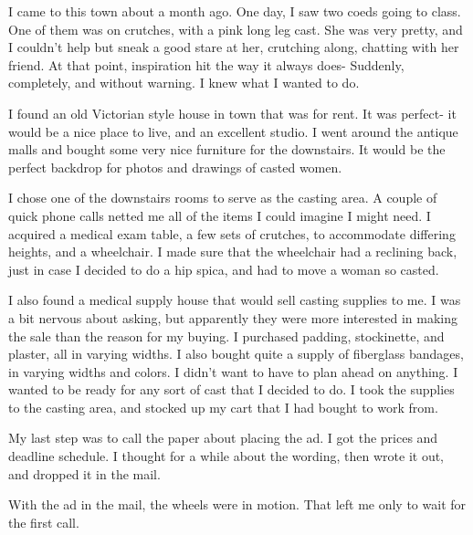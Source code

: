 I came to this town about a month ago. One day, I saw two coeds going to class. One of them
was on crutches, with a pink long leg cast. She was very pretty, and I couldn't help but sneak a
good stare at her, crutching along, chatting with her friend. At that point, inspiration hit the
way it always does- Suddenly, completely, and without warning. I knew what I wanted to do.

I found an old Victorian style house in town that was for rent. It was perfect- it would be
a nice place to live, and an excellent studio. I went around the antique malls and bought some
very nice furniture for the downstairs. It would be the perfect backdrop for photos and drawings
of casted women.

I chose one of the downstairs rooms to serve as the casting area. A couple of quick phone
calls netted me all of the items I could imagine I might need. I acquired a medical exam table,
a few sets of crutches, to accommodate differing heights, and a wheelchair. I made sure that the
wheelchair had a reclining back, just in case I decided to do a hip spica, and had to move a
woman so casted.

I also found a medical supply house that would sell casting supplies to me. I was a bit
nervous about asking, but apparently they were more interested in making the sale than the
reason for my buying. I purchased padding, stockinette, and plaster, all in varying widths. I
also bought quite a supply of fiberglass bandages, in varying widths and colors. I didn't want
to have to plan ahead on anything. I wanted to be ready for any sort of cast that I decided to
do. I took the supplies to the casting area, and stocked up my cart that I had bought to work
from.

My last step was to call the paper about placing the ad. I got the prices and deadline
schedule. I thought for a while about the wording, then wrote it out, and dropped it in the
mail.

With the ad in the mail, the wheels were in motion. That left me only to wait for the first
call.
